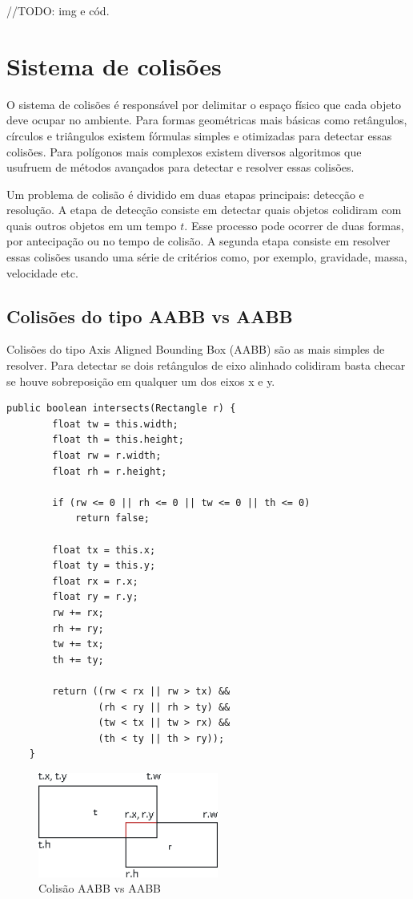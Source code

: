 \documentclass[12pt, 
openright, 
oneside, 
a4paper,    
brazil]{facom-ufu-abntex2}
\begin{document}
//TODO: img e cód.

\section{Sistema de colisões}

O sistema de colisões é responsável por delimitar o espaço físico que cada objeto deve ocupar no ambiente. Para formas geométricas mais básicas como retângulos, círculos e triângulos existem fórmulas simples e otimizadas para detectar essas colisões. Para polígonos mais complexos existem diversos algoritmos que usufruem de métodos avançados para detectar e resolver essas colisões.

Um problema de colisão é dividido em duas etapas principais: detecção e resolução. A etapa de detecção consiste em detectar quais objetos colidiram com quais outros objetos em um tempo $t$. Esse processo pode ocorrer de duas formas, por antecipação ou no tempo de colisão. A segunda etapa consiste em resolver essas colisões usando uma série de critérios como, por exemplo, gravidade, massa, velocidade etc.

\subsection{Colisões do tipo AABB vs AABB}

Colisões do tipo Axis Aligned Bounding Box (AABB) são as mais simples de resolver. Para detectar se dois retângulos de eixo alinhado colidiram basta checar se houve sobreposição em qualquer um dos eixos x e y.

\begin{lstlisting}[caption=Colisão AABB vs AABB]
	public boolean intersects(Rectangle r) {
    	float tw = this.width;
        float th = this.height;
        float rw = r.width;
        float rh = r.height;
        
        if (rw <= 0 || rh <= 0 || tw <= 0 || th <= 0) 
            return false;
        
        float tx = this.x;
        float ty = this.y;
        float rx = r.x;
        float ry = r.y;
        rw += rx;
        rh += ry;
        tw += tx;
        th += ty;
      
        return ((rw < rx || rw > tx) && 
                (rh < ry || rh > ty) &&
                (tw < tx || tw > rx) && 
                (th < ty || th > ry)); 
    }
\end{lstlisting}


\begin{figure}[H]
	\centering
	\includegraphics[width=16em]{imagens/aabbaabb.png}
	\caption{Colisão AABB vs AABB}
\end{figure}
\end{document}
